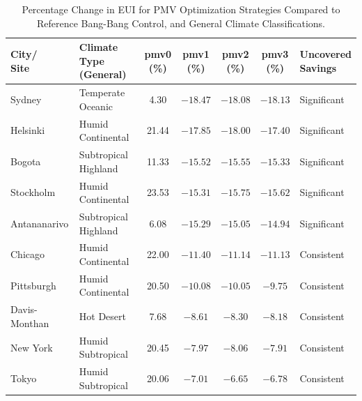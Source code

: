 \begin{table}[htbp]
\centering
\small %
\caption{Percentage Change in EUI for PMV Optimization Strategies Compared to Reference Bang-Bang Control, and General Climate Classifications.}
\label{tab:pmv_results}
\setlength{\tabcolsep}{4pt}
\begin{tabularx}{\textwidth}{@{} l >{\raggedright\arraybackslash}X c c c c >{\raggedright\arraybackslash}X @{}}
\toprule
\makecell[l]{City/\\Site} & \makecell[l]{Climate Type\\(General)} & \makecell{pmv0\\(\%)} & \makecell{pmv1\\(\%)} & \makecell{pmv2\\(\%)} & \makecell{pmv3\\(\%)} & \makecell[l]{Uncovered\\Savings}\\
\midrule
Sydney       & Temperate Oceanic        & 4.30  & $-18.47$ & $-18.08$ & $-18.13$ & Significant  \\
Helsinki     & Humid Continental        & 21.44 & $-17.85$ & $-18.00$ & $-17.40$ & Significant  \\
Bogota       & Subtropical Highland     & 11.33 & $-15.52$ & $-15.55$ & $-15.33$ & Significant  \\
Stockholm    & Humid Continental        & 23.53 & $-15.31$ & $-15.75$ & $-15.62$ & Significant  \\
Antananarivo & Subtropical Highland     & 6.08  & $-15.29$ & $-15.05$ & $-14.94$ & Significant  \\
Chicago      & Humid Continental        & 22.00 & $-11.40$ & $-11.14$ & $-11.13$ & Consistent   \\
Pittsburgh   & Humid Continental        & 20.50 & $-10.08$ & $-10.05$ & $-9.75$  & Consistent   \\
Davis-Monthan& Hot Desert               & 7.68  & $-8.61$  & $-8.30$  & $-8.18$  & Consistent   \\
New York     & Humid Subtropical        & 20.45 & $-7.97$  & $-8.06$  & $-7.91$  & Consistent   \\
Tokyo        & Humid Subtropical        & 20.06 & $-7.01$  & $-6.65$  & $-6.78$  & Consistent   \\
\bottomrule
\end{tabularx}
\vspace{0.7em} %
\end{table}


